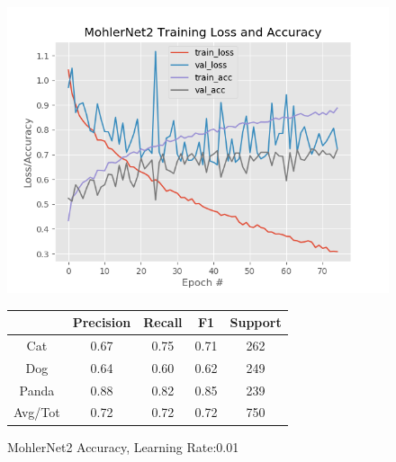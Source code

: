 \documentclass[12pt]{article}
\begin{document}
\begin{figure}[h]
	\centering %
	\captionsetup{justification=centering}
	\begin{minipage}{0.5\textwidth}
		\centering %
		\includegraphics[width=1\textwidth]{MohlerNet2_opt-SGD_KEEP.png}
		\caption{MohlerNet2 Accuracy, Learning Rate:0.01} \label{MN2}
	\end{minipage}\hfill
	\begin{minipage}{0.5\textwidth}
		\begin{center}
			\begin{tabular}[5pt]{| c| c| c| c|c|}
				\hline
					& Precision & Recall & F1 & Support \\[0.5ex] 
				\hline 	
				 Cat   &    0.67  &    0.75   &   0.71   &    262\\ \hline 
				 Dog    &   0.64    &  0.60   &   0.62   &    249\\ \hline 
				 Panda   &    0.88   &  0.82 &     0.85  &     239\\ \hline 
				 Avg/Tot  &     0.72    &  0.72 &     0.72    &   750\\ \hline 

			\end{tabular}
			\label{MNR}
		\end{center}	
	\end{minipage}
\end{figure}
\end{document}

